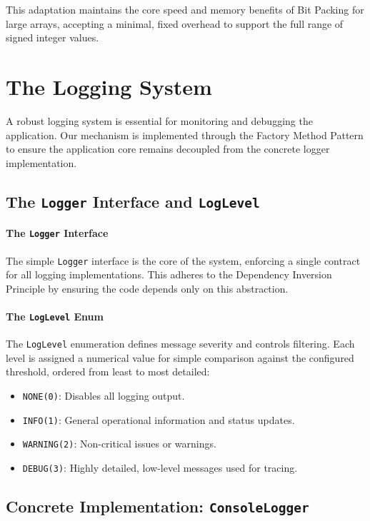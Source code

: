 \documentclass[11pt, a4paper]{article}
\begin{document}
	This adaptation maintains the core speed and memory benefits of Bit Packing for large arrays, accepting a minimal, fixed overhead to support the full range of signed integer values.
	
	
	\section{The Logging System}
	\label{sec:logging_system}
	
	A robust logging system is essential for monitoring and debugging the application. Our mechanism is implemented through the Factory Method Pattern to ensure the application core remains decoupled from the concrete logger implementation.
	
	\subsection{The \texttt{Logger} Interface and \texttt{LogLevel}}
	
	\paragraph{The \texttt{Logger} Interface}
	The simple \texttt{Logger} interface is the core of the system, enforcing a single contract for all logging implementations. This adheres to the Dependency Inversion Principle by ensuring the code depends only on this abstraction.
	
	
	\paragraph{The \texttt{LogLevel} Enum}
	The \texttt{LogLevel} enumeration defines message severity and controls filtering. Each level is assigned a numerical value for simple comparison against the configured threshold, ordered from least to most detailed:
	
	\begin{itemize}
		\item \texttt{NONE(0)}: Disables all logging output.
		\item \texttt{INFO(1)}: General operational information and status updates.
		\item \texttt{WARNING(2)}: Non-critical issues or warnings.
		\item \texttt{DEBUG(3)}: Highly detailed, low-level messages used for tracing.
	\end{itemize}
	
	\subsection{Concrete Implementation: \texttt{ConsoleLogger}}
	
\end{document}
